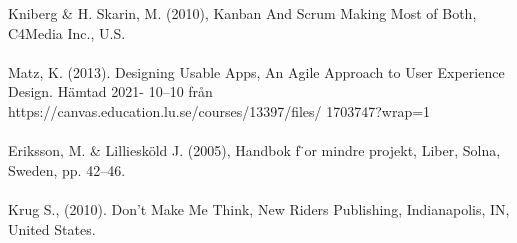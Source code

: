 \documentclass[12pt]{article}
\begin{document}
\noindent
[2] Kniberg \& H. Skarin, M. (2010), Kanban And Scrum Making Most of Both, C4Media Inc., U.S. \\\\
\noindent
[3] Matz, K. (2013). Designing Usable Apps, An Agile Approach to User Experience Design. Hämtad 2021-
10–10 från https://canvas.education.lu.se/courses/13397/files/
1703747?wrap=1 \\\\
\noindent
[4] Eriksson, M. \& Lilliesköld J. (2005), Handbok f ̈or mindre projekt, Liber, Solna, Sweden, pp. 42–46. \\\\

\noindent
[5] Krug S., (2010). Don’t Make Me Think, New Riders Publishing, Indianapolis, IN, United States. \\\\



\end{document}

